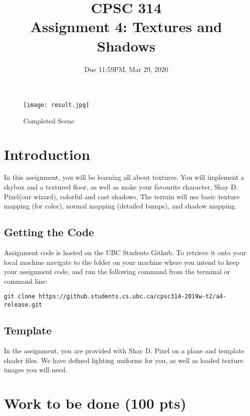 \documentclass[12pt]{exam}
\begin{document}
\title{CPSC 314\\
  Assignment 4: Textures and Shadows}
\date{Due 11:59PM, Mar 29, 2020}

\maketitle

\begin{figure}[h]
    \centering
   \texttt{[image: result.jpg]}
    \caption{Completed Scene}
\end{figure}

\section{Introduction}

In this assignment, you will be learning all about textures. You will implement a skybox and a textured floor, as well as make your favourite character, Shay D. Pixel(our wizard), colorful and cast shadows. The terrain will use basic texture mapping (for color), normal mapping (detailed bumps), and shadow mapping.

\subsection{Getting the Code}
Assignment code is hosted on the UBC Students Github. To retrieve it onto your local machine navigate to the folder on your machine 
where you intend to keep your assignment code, and run the following command from the terminal or command line:

\medskip

{\tt git clone https://github.students.cs.ubc.ca/cpsc314-2019w-t2/a4-release.git}

\subsection{Template}
In the assignment, you are provided with Shay D. Pixel on a plane and template shader files. We have defined lighting uniforms for you, as well as loaded texture images you will need.

\section{Work to be done (100 pts)}
\end{document}
